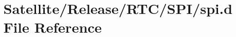 \hypertarget{_release_2_r_t_c_2_s_p_i_2spi_8d}{\section{Satellite/\-Release/\-R\-T\-C/\-S\-P\-I/spi.d File Reference}
\label{_release_2_r_t_c_2_s_p_i_2spi_8d}
}
